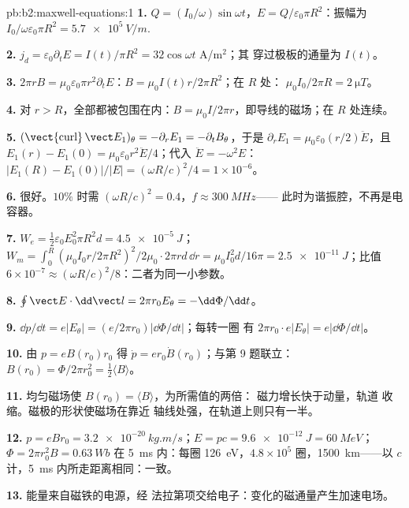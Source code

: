 \begin{solution}{pb:b2:maxwell-equations:1}
\textbf{1.} $Q = (I_0/\omega)\sin\omega t$，$E = Q/\varepsilon_0\pi R^2$：振幅为 $I_0/\omega\varepsilon_0
\pi R^2 = \qty{5.7e5}{V/m}$.

\textbf{2.} $j_d = \varepsilon_0\partial_tE = I(t)/\pi R^2 = 32\cos\omega t$ A/m$^2$；其
穿过极板的通量为 $I(t)$。

\textbf{3.} $2\pi rB = \mu_0\varepsilon_0\pi r^2\partial_tE$：$B = \mu_0I(t)r/2\pi R^2$；在 $R$ 处：
$\mu_0I_0/2\pi R = \qty{2}{\micro T}$。

\textbf{4.} 对 $r > R$，全部都被包围在内：$B =
\mu_0I/2\pi r$，即导线的磁场；在 $R$ 处连续。

\textbf{5.} $(\operatorname{\vect{curl}}\vect E_1)_\theta = -\partial_rE_1 = -\partial_tB_\theta$，于是 $\partial_rE_1
= \mu_0\varepsilon_0(r/2)\ddot E$，且 $E_1(r) - E_1(0) = \mu_0\varepsilon_0r^2\ddot E/4$；代入
$\ddot E = -\omega^2E$：$|E_1(R) - E_1(0)|/|E| = (\omega R/c)^2/4 = 1 \times 10^{-6}$。

\textbf{6.} 很好。$10\%$ 时需 $(\omega R/c)^2 = 0.4$，$f \approx \qty{300}{MHz}$——
此时为谐振腔，不再是电容器。

\textbf{7.} $W_e = \tfrac12\varepsilon_0E_0^2\pi R^2d = \qty{4.5e-5}{J}$；$W_m = \int_0^R(\mu_0I_0r/
2\pi R^2)^2/2\mu_0\cdot2\pi rd\,\dd r = \mu_0I_0^2d/16\pi = \qty{2.5e-11}{J}$；比值 $6 \times
10^{-7} \approx (\omega R/c)^2/8$：二者为同一小参数。

\textbf{8.} $\oint\vect E\cdot\dd\vect l = 2\pi r_0E_\theta = -\dd\Phi/\dd t$。

\textbf{9.} $\dd p/\dd t = e|E_\theta| = (e/2\pi r_0)|\dd\Phi/\dd t|$；每转一圈
有 $2\pi r_0\cdot e|E_\theta| = e|\dd\Phi/\dd t|$。

\textbf{10.} 由 $p = eB(r_0)r_0$ 得 $\dot p = er_0\dot B(r_0)$；与第 9 题联立：
$B(r_0) = \Phi/2\pi r_0^2 = \tfrac12\langle B\rangle$。

\textbf{11.} 均匀磁场使 $B(r_0) = \langle B\rangle$，为所需值的两倍：
磁力增长快于动量，轨道
收缩。磁极的形状使磁场在靠近
轴线处强，在轨道上则只有一半。

\textbf{12.} $p = eBr_0 = \qty{3.2e-20}{kg.m/s}$；$E = pc = \qty{9.6e-12}{J} = \qty{60}{MeV}$；
$\Phi = 2\pi r_0^2B = \qty{0.63}{Wb}$ 在 \qty{5}{ms} 内：每圈 \qty{126}{eV}，$4.8 \times
10^5$ 圈，\qty{1500}{km}——以 $c$ 计，\qty{5}{ms} 内所走距离相同：一致。

\textbf{13.} 能量来自磁铁的电源，经
法拉第项交给电子：变化的磁通量产生加速电场。


\end{solution}

